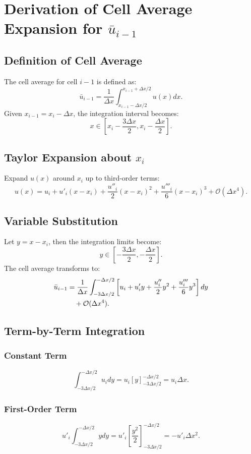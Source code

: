 \documentclass{article}
\begin{document}
\section{Derivation of Cell Average Expansion for $\bar{u}_{i-1}$}

\subsection{Definition of Cell Average}
The cell average for cell $i-1$ is defined as:
\[
\bar{u}_{i-1} = \frac{1}{\Delta x} \int_{x_{i-1}-\Delta x/2}^{x_{i-1}+\Delta x/2} u(x) dx.
\]
Given $x_{i-1} = x_i - \Delta x$, the integration interval becomes:
\[
x \in \left[ x_i - \frac{3\Delta x}{2}, x_i - \frac{\Delta x}{2} \right].
\]

\subsection{Taylor Expansion about $x_i$}
Expand $u(x)$ around $x_i$ up to third-order terms:
\[
u(x) = u_i + u'_i (x - x_i) + \frac{u''_i}{2} (x - x_i)^2 + \frac{u'''_i}{6} (x - x_i)^3 + \mathcal{O}(\Delta x^4).
\]

\subsection{Variable Substitution}
Let $y = x - x_i$, then the integration limits become:
\[
y \in \left[ -\frac{3\Delta x}{2}, -\frac{\Delta x}{2} \right].
\]
The cell average transforms to:
\begin{align}
\bar{u}_{i-1} &= \frac{1}{\Delta x} \int_{-3\Delta x/2}^{-\Delta x/2} \left[ u_i + u'_i y + \frac{u''_i}{2} y^2 + \frac{u'''_i}{6} y^3 \right] dy \notag \\
&\quad + \mathcal{O}(\Delta x^4).
\end{align}

\subsection{Term-by-Term Integration}
\subsubsection{Constant Term}
\[
\int_{-3\Delta x/2}^{-\Delta x/2} u_i dy = u_i \left[ y \right]_{-3\Delta x/2}^{-\Delta x/2} = u_i \Delta x.
\]

\subsubsection{First-Order Term}
\[
u'_i \int_{-3\Delta x/2}^{-\Delta x/2} y dy = u'_i \left[ \frac{y^2}{2} \right]_{-3\Delta x/2}^{-\Delta x/2} = -u'_i \Delta x^2.
\]
\end{document}
